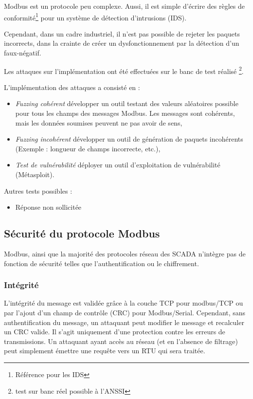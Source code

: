 \documentclass[10pt,a4paper]{article}
\begin{document}
		Modbus est un protocole peu complexe. Aussi, il est simple d'écrire des règles de conformité\footnote{Référence pour les IDS} pour un système de détection d'intrusions (IDS).
		
		Cependant, dans un cadre industriel, il n'est pas possible de rejeter les paquets incorrects, dans la crainte de créer un dysfonctionnement par la détection d'un faux-négatif.
		
		Les attaques sur l'implémentation ont été effectuées sur le banc de test réalisé \footnote{test sur banc réel possible à l'ANSSI}.
		
		L'implémentation des attaques a consisté en :
		\begin{itemize}
		\item \textit{Fuzzing cohérent} développer un outil testant des valeurs aléatoires possible pour tous les champs des messages Modbus. Les messages sont cohérents, mais les données soumises peuvent ne pas avoir de sens,
		\item \textit{Fuzzing incohérent} développer un outil de génération de paquets incohérents (Exemple : longueur de champs incorrecte, etc.),
		\item \textit{Test de vulnérabilité} déployer un outil d'exploitation de vulnérabilité (Métasploit).
		\end{itemize}
		
		
		Autres tests possibles :
		\begin{itemize}
		\item Réponse non sollicitée
	    \end{itemize}
		
	\subsection{Sécurité du protocole Modbus}

        Modbus, ainsi que la majorité des protocoles réseau des SCADA n'intègre pas de fonction de sécurité telles que l'authentification ou le chiffrement.

        \subsubsection{Intégrité}
	        L'intégrité du message est validée grâce à la couche TCP pour modbus/TCP ou par l'ajout d'un champ de contrôle (CRC) pour Modbus/Serial. Cependant, sans authentification du message, un attaquant peut modifier le message et recalculer un CRC valide. Il s'agit uniquement d'une protection contre les erreurs de transmissions.
	        Un attaquant ayant accès au réseau (et en l'absence de filtrage) peut simplement émettre une requ\^ete vers un RTU qui sera traitée.
	        
\end{document}
